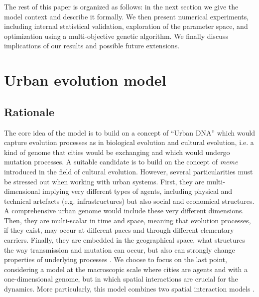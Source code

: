 \documentclass[letterpaper]{article}
\begin{document}
The rest of this paper is organized as follows: in the next section we give the model context and describe it formally. We then present numerical experiments, including internal statistical validation, exploration of the parameter space, and optimization using a multi-objective genetic algorithm. We finally discuss implications of our results and possible future extensions.



\section{Urban evolution model}

\subsection{Rationale}

The core idea of the model is to build on a concept of ``Urban DNA'' which would capture evolution processes as in biological evolution and cultural evolution, i.e. a kind of genome that cities would be exchanging and which would undergo mutation processes. A suitable candidate is to build on the concept of \emph{meme} introduced in the field of cultural evolution. However, several particularities must be stressed out when working with urban systems. First, they are multi-dimensional implying very different types of agents, including physical and technical artefacts (e.g. infrastructures) but also social and economical structures. A comprehensive urban genome would include these very different dimensions. Then, they are multi-scalar in time and space, meaning that evolution processes, if they exist, may occur at different paces and through different elementary carriers. Finally, they are embedded in the geographical space, what structures the way transmission and mutation can occur, but also can strongly change properties of underlying processes \citep{raimbault2019space}. We choose to focus on the last point, considering a model at the macroscopic scale where cities are agents and with a one-dimensional genome, but in which spatial interactions are crucial for the dynamics. More particularly, this model combines two spatial interaction models \citep{fotheringham1989spatial}.
\end{document}
